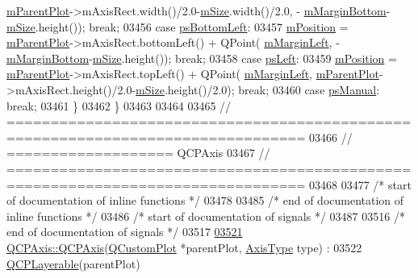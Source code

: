 \begin{DoxyCode}
      \hyperlink{a00044_aa2a528433e44db02b8aef23c1f9f90ed}{mParentPlot}->mAxisRect.width()/2.0-\hyperlink{a00045_aa55b33bf64e26c76e6475fd3140af8a2}{mSize}.width()/2.0, -
      \hyperlink{a00045_a3df9b3c2d4af5f8b484cc7c4b64b20c8}{mMarginBottom}-\hyperlink{a00045_aa55b33bf64e26c76e6475fd3140af8a2}{mSize}.height()); \textcolor{keywordflow}{break};
03456     \textcolor{keywordflow}{case} \hyperlink{a00045_aa61c3d82a6c7942dddefbf1ed1f7049fa36e2c1900a0d39596ee26074c7815ee9}{psBottomLeft}:
03457       \hyperlink{a00045_a1a1033e581aba17a234a320b7fffc739}{mPosition} = \hyperlink{a00044_aa2a528433e44db02b8aef23c1f9f90ed}{mParentPlot}->mAxisRect.bottomLeft() + QPoint(
      \hyperlink{a00045_abc32b5c03a201ff2a4225503c0f5c8e0}{mMarginLeft}, -\hyperlink{a00045_a3df9b3c2d4af5f8b484cc7c4b64b20c8}{mMarginBottom}-\hyperlink{a00045_aa55b33bf64e26c76e6475fd3140af8a2}{mSize}.height()); \textcolor{keywordflow}{break};
03458     \textcolor{keywordflow}{case} \hyperlink{a00045_aa61c3d82a6c7942dddefbf1ed1f7049fac9c7c1c0f8d1894792fbb71854002ebe}{psLeft}:
03459       \hyperlink{a00045_a1a1033e581aba17a234a320b7fffc739}{mPosition} = \hyperlink{a00044_aa2a528433e44db02b8aef23c1f9f90ed}{mParentPlot}->mAxisRect.topLeft() + QPoint(
      \hyperlink{a00045_abc32b5c03a201ff2a4225503c0f5c8e0}{mMarginLeft}, \hyperlink{a00044_aa2a528433e44db02b8aef23c1f9f90ed}{mParentPlot}->mAxisRect.height()/2.0-\hyperlink{a00045_aa55b33bf64e26c76e6475fd3140af8a2}{mSize}.height()/2.0); \textcolor{keywordflow}{break};
03460     \textcolor{keywordflow}{case} \hyperlink{a00045_aa61c3d82a6c7942dddefbf1ed1f7049fadfd57c395cae91cd95231c926c0a38ca}{psManual}: \textcolor{keywordflow}{break};
03461   \}
03462 \}
03463 
03464 
03465 \textcolor{comment}{// ================================================================================}
03466 \textcolor{comment}{// =================== QCPAxis}
03467 \textcolor{comment}{// ================================================================================}
03468 
03477 \textcolor{comment}{/* start of documentation of inline functions */}
03478 
03485 \textcolor{comment}{/* end of documentation of inline functions */}
03486 \textcolor{comment}{/* start of documentation of signals */}
03487 
03516 \textcolor{comment}{/* end of documentation of signals */}
03517 
\hypertarget{a00115_source_l03521}{}\hyperlink{a00025_a5a34dafa051be08d03e89c163c507f90}{03521} \hyperlink{a00025_a5a34dafa051be08d03e89c163c507f90}{QCPAxis::QCPAxis}(\hyperlink{a00030_d8/d00/a00186}{QCustomPlot} *parentPlot, \hyperlink{a00025_ae2bcc1728b382f10f064612b368bc18a}{AxisType} type) :
03522   \hyperlink{a00044}{QCPLayerable}(parentPlot)

\end{DoxyCode}
